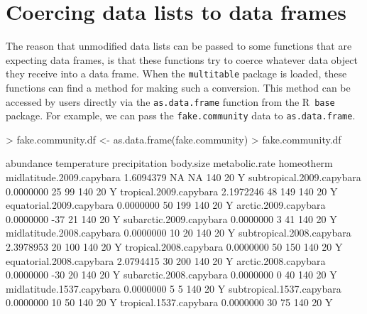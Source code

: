 \documentclass{article}
\newcommand{\R}{{\sf R}}
\newcommand{\code}[1]{\texttt{#1}}
\numberwithin{exercise}{section}
\begin{document}
\section{Coercing data lists to data frames}


The reason that unmodified data lists can be passed to some functions that are expecting data frames, is that these functions try to coerce whatever data object they receive into a data frame.  When the \code{multitable} package is loaded, these functions can find a method for making such a conversion.  This method can be accessed by users directly via the \code{as.data.frame} function from the \R\ \code{base} package.  For example, we can pass the \code{fake.community} data to \code{as.data.frame}.
\begin{Schunk}
\begin{Sinput}
> fake.community.df <- as.data.frame(fake.community)
> fake.community.df
\end{Sinput}
\begin{Soutput}
                          abundance temperature precipitation body.size metabolic.rate homeotherm
midlatitude.2009.capybara 1.6094379          NA            NA       140             20          Y
subtropical.2009.capybara 0.0000000          25            99       140             20          Y
tropical.2009.capybara    2.1972246          48           149       140             20          Y
equatorial.2009.capybara  0.0000000          50           199       140             20          Y
arctic.2009.capybara      0.0000000         -37            21       140             20          Y
subarctic.2009.capybara   0.0000000           3            41       140             20          Y
midlatitude.2008.capybara 0.0000000          10            20       140             20          Y
subtropical.2008.capybara 2.3978953          20           100       140             20          Y
tropical.2008.capybara    0.0000000          50           150       140             20          Y
equatorial.2008.capybara  2.0794415          30           200       140             20          Y
arctic.2008.capybara      0.0000000         -30            20       140             20          Y
subarctic.2008.capybara   0.0000000           0            40       140             20          Y
midlatitude.1537.capybara 0.0000000           5             5       140             20          Y
subtropical.1537.capybara 0.0000000          10            50       140             20          Y
tropical.1537.capybara    0.0000000          30            75       140             20          Y

\end{Soutput}
\end{Schunk}
\end{document}
